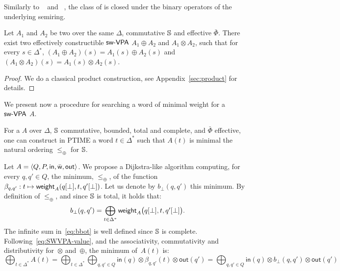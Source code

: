 \medskip\noindent
Similarly to \VPA~\cite{AlurMadhusudan09nested}
and \SVPA~\cite{dAntonyAlur14SVPDA},
the class of \SWVPA is closed under the binary operators of the underlying semiring.
%
\begin{proposition}\label{prop:SWVPA-product}
Let $A_1$ and $A_2$ be two \SWVPA
over the same $\Delta$, commutative $\mathbb{S}$ and effective $\bar\Phi$.
There exist two effectively constructible $\textsf{sw-VPA}$
$A_1 \oplus A_2$ and $A_1 \otimes A_2$,
such that for every $s \in \Delta^*$,
$(A_1 \oplus A_2)(s) = A_1(s) \oplus A_2(s)$ and
$(A_1 \otimes A_2)(s) = A_1(s) \otimes A_2(s)$.
\end{proposition}
%
\begin{proof}
We do a classical product construction, see Appendix~\ref{sec:product} for details.
\end{proof}
\noindent
We present now a procedure for searching a word of minimal weight for a~$\textsf{sw-VPA}$ $A$.
%
\begin{proposition}\label{th:best-search}
For a \SWVPA $A$
over $\Delta$,
$\mathbb{S}$ commutative, bounded, total and complete, %
and $\bar\Phi$ effective, %
one can construct in PTIME a word $t \in \Delta^*$
such that $A(t)$ is minimal \wrt the natural ordering $\leq_\oplus$ for $\mathbb{S}$.
\end{proposition}
%
Let $A = \< Q, P, \init, \bar\wei, \final >$.
%
We propose a Dijkstra-like algorithm computing,
for every $q, q' \in Q$,
the minimum, \wrt $\leq_\oplus$, of the function
$\beta_{q, q'} : t \mapsto \mathsf{weight}_A(q[{\bot}], t, q'[{\bot}])$.
Let us denote by $b_\bot(q, q')$ this minimum.
By definition of $\leq_\oplus$, and since $\mathbb{S}$ is total,
it holds that:
%
\begin{equation}\label{eq:bbot}
  b_\bot(q, q') = \bigoplus_{t\in \Delta^*}
  \textstyle
  \mathsf{weight}_A\bigl(q[{\bot}], t, q'[{\bot}]\bigr).
\end{equation}
The infinite sum in~\eqref{eq:bbot} is well defined since $\mathbb{S}$ is complete.
%
Following~\eqref{eq:SWVPA-value}, and the associativity, commutativity
and distributivity for~$\otimes$ and~$\oplus$, the minimum of~$A(t)$ is:
\begin{equation}\label{eq:min}
{\displaystyle\bigoplus_{t\in \Delta^*}} A(t)
=
{\displaystyle\bigoplus_{t\in \Delta^*}}
{\displaystyle\bigoplus_{q, q' \in Q}} \textstyle
\mathsf{in}(q) \mathop{\otimes}
\beta_{q, q'}(t)
\mathop{\otimes} \mathsf{out}(q')
=
{\displaystyle\bigoplus_{q, q' \in Q}} \textstyle
\mathsf{in}(q) \mathop{\otimes}
b_\bot(q, q')
\mathop{\otimes} \mathsf{out}(q')
\end{equation}

